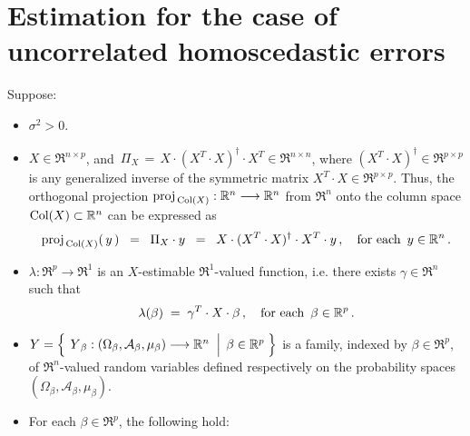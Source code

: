 

\section{Estimation for the case of uncorrelated homoscedastic errors}
\setcounter{theorem}{0}
\setcounter{equation}{0}

\renewcommand{\theenumi}{\roman{enumi}}
\renewcommand{\labelenumi}{\textnormal{(\theenumi)}$\;\;$}


\begin{theorem}
\mbox{}
\vskip 0.1cm
\noindent
Suppose:
\begin{itemize}
\item
	$\sigma^{2} > 0$.
\item
	$X \in \Re^{n \times p}$, and
	\,$\Pi_{X} \,=\, X \cdot (X^{T} \cdot X)^{\dagger} \cdot X^{T} \in \Re^{n \times n}$,
	where $(X^{T} \cdot X)^{\dagger} \in \Re^{p \times p}$
	is any generalized inverse of the symmetric matrix
	$X^{T} \cdot X \in \Re^{p \times p}$.
	Thus, the orthogonal projection $\proj_{\,\Col(X)} : \Re^{n} \longrightarrow \Re^{n}$
	from $\Re^{n}$ onto the column space $\Col(X) \subset \Re^{n}$ can be expressed as
	\begin{equation*}
	\proj_{\,\Col(X)}(\,y\,)
	\;\; = \;\;
		\Pi_{X} \cdot y
	\;\; = \;\;
		X \cdot (X^{T} \cdot X)^{\dagger} \cdot X^{T} \cdot y\,,
	\quad
	\textnormal{for each \,$y \in \Re^{n}$}\,.
	\end{equation*}
\item
	$\lambda : \Re^{p} \longrightarrow \Re^{1}$ is an $X$-estimable $\Re^{1}$-valued function, i.e.
	there exists $\gamma \in \Re^{n}$ such that
	\begin{equation*}
	\lambda(\beta) \; = \; \gamma^{T} \cdot X \cdot \beta\,,
	\quad\textnormal{for each \,$\beta \in \Re^{p}$}\,.
	\end{equation*}
\item
	$Y = \left\{\;
		\left.
		\overset{{\color{white}.}}{Y}_{\beta} : (\Omega_{\beta},\mathcal{A}_{\beta},\mu_{\beta}) \longrightarrow \Re^{n}
		\;\;\right\vert\;
		\beta \in \Re^{p}
		\;\right\}$
	is a family, indexed by $\beta \in \Re^{p}$,
	of $\Re^{n}$-valued random variables defined respectively on the
	probability spaces $(\Omega_{\beta},\mathcal{A}_{\beta},\mu_{\beta})$.
\item
	For each $\beta \in \Re^{p}$, the following hold:
	\begin{equation*}

\end{equation*}
\end{itemize}
\end{theorem}
